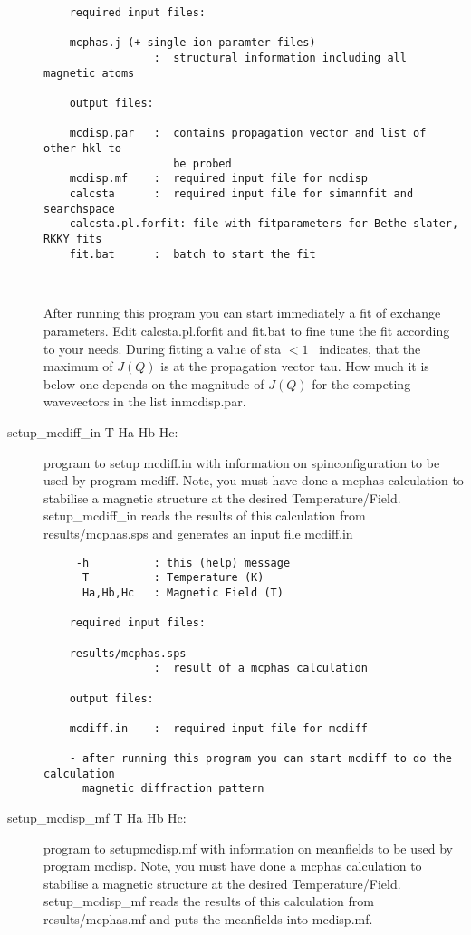 \begin{description}
\begin{verbatim}
    required input files:

    mcphas.j (+ single ion paramter files)
                 :  structural information including all magnetic atoms

    output files:

    mcdisp.par   :  contains propagation vector and list of other hkl to
                    be probed
    mcdisp.mf    :  required input file for mcdisp
    calcsta      :  required input file for simannfit and searchspace
    calcsta.pl.forfit: file with fitparameters for Bethe slater, RKKY fits
    fit.bat      :  batch to start the fit

   
\end{verbatim}

 After running this program you can start immediately a fit of exchange
    parameters. Edit {\prg calcsta.pl.forfit} and {\prg fit.bat} to fine tune the fit 
    according to your needs.
    During fitting a value of sta $< 1$~ indicates, that the maximum of $J(Q)$ is
    at the propagation vector tau. How much it is below one depends on the
    magnitude of $J(Q)$ for the competing wavevectors in the list in{\prg  mcdisp.par}.

\item [\prg setup\_mcdiff\_in\index{setup\_mcdiff\_in}  T Ha Hb Hc:] program
 to setup {\prg mcdiff.in} with information on spinconfiguration
                    to be used by program {\prg mcdiff}. Note, you must
                    have done a {\prg mcphas} calculation to stabilise
                    a magnetic structure at the desired Temperature/Field.
                  { \prg   setup\_mcdiff\_in} reads the results of this calculation
                    from {\prg results/mcphas.sps} and generates an input file
                    {\prg mcdiff.in}

\begin{verbatim}
     -h          : this (help) message
      T          : Temperature (K)
      Ha,Hb,Hc   : Magnetic Field (T)

    required input files:

    results/mcphas.sps
                 :  result of a mcphas calculation

    output files:

    mcdiff.in    :  required input file for mcdiff

    - after running this program you can start mcdiff to do the calculation
      magnetic diffraction pattern
\end{verbatim}
\item [ \prg   setup\_mcdisp\_mf \index{setup\_mcdisp\_mf} T Ha Hb Hc:] program to setup{\prg mcdisp.mf} with information on meanfields
                    to be used by program {\prg mcdisp}. Note, you must
                    have done a {\prg mcphas} calculation to stabilise
                    a magnetic structure at the desired Temperature/Field.
                    {\prg   setup\_mcdisp\_mf} reads the results of this calculation
                    from {\prg  results/mcphas.mf} and puts the meanfields into
                    {\prg mcdisp.mf}.



\end{description}
